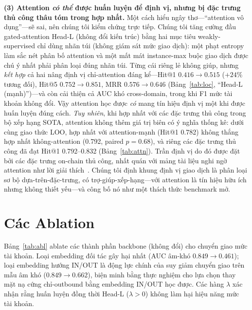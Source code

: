 \documentclass[conference]{IEEEtran}
\begin{document}
\noindent\textbf{(3) Attention \emph{có thể} được huấn luyện để định vị, nhưng bị
đặc trưng thủ công thâu tóm trong hợp nhất.} Một cách hiểu ngây thơ---``attention vô
dụng''---sẽ sai, nên chúng tôi kiểm chứng trực tiếp. Chúng tôi tăng cường đầu
gated-attention Head-L (không đổi kiến trúc) bằng hai mục tiêu weakly-supervised chỉ
dùng nhãn túi (không giám sát mức giao dịch): một phạt entropy làm sắc nét phân bố
attention và một mất mát instance-max buộc giao dịch được chú ý nhất phải phân loại
đúng nhãn túi. Từng cái riêng lẻ không giúp, nhưng \emph{kết hợp} cả hai nâng định vị
chỉ-attention đáng kể---Hit@1 $0.416\!\rightarrow\!0.515$ ($+24\%$ tương đối), Hit@5
$0.752\!\rightarrow\!0.851$, MRR $0.576\!\rightarrow\!0.646$ (Bảng~\ref{tab:loc},
``Head-L (mạnh)'')---và còn cải thiện cả AUC khó cross-domain, trong khi F1 mức tài
khoản không đổi. Vậy attention học được \emph{có} mang tín hiệu định vị một khi được
huấn luyện đúng cách. \emph{Tuy nhiên}, khi hợp nhất với các đặc trưng thủ công trong
bộ xếp hạng SOTA, attention không thêm giá trị biên có ý nghĩa thống kê: dưới cùng
giao thức LOO, hợp nhất với attention-mạnh (Hit@1 0.782) không thắng hợp nhất
không-attention (0.792, paired $p{=}0.68$), và riêng các đặc trưng thủ công đã đạt
Hit@1 0.792--0.832 (Bảng~\ref{tab:attn}). Trần định vị do đó được đặt bởi các đặc
trưng on-chain thủ công, nhất quán với mảng tài liệu nghi ngờ attention như lời giải
thích~\cite{jain2019}. Chúng tôi định khung định vị giao dịch là phân loại sơ bộ
dựa-trên-đặc-trưng, có trợ-giúp-xếp-hạng---với attention là tín hiệu hữu ích nhưng
không thiết yếu---và công bố nó như một thách thức benchmark mở.

\section{Các Ablation}
Bảng~\ref{tab:abl} ablate các thành phần backbone (không đổi) cho chuyển giao mức
tài khoản. Loại embedding đối tác gây hại nhất (AUC âm-khó
$0.849{\rightarrow}0.461$); loại embedding hướng IN/OUT là động lực chính của suy
giảm chuyển giao trên mẫu âm khó ($0.849{\rightarrow}0.662$), biện minh bằng thực
nghiệm cho lựa chọn thay mặt nạ cứng chỉ-outbound bằng embedding IN/OUT học được.
Các hàng $\lambda$ xác nhận rằng huấn luyện đồng thời Head-L ($\lambda{>}0$) không
làm hại hiệu năng mức tài khoản.
\end{document}
